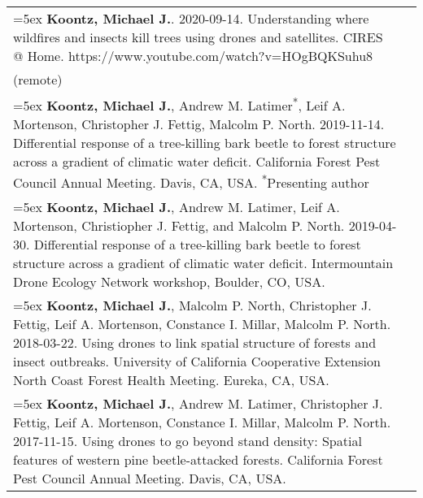 \begin{longtable}{@{}>{\raggedright}p{5.25in} @{} >{\raggedleft}X@{}}
\hangindent=5ex \textbf{Koontz, Michael J.}. 2020-09-14. Understanding where wildfires and insects kill trees using drones and satellites. CIRES @ Home. https://www.youtube.com/watch?v=HOgBQKSuhu8 & 2020 \\ (remote) \tabularnewline

\hangindent=5ex \textbf{Koontz, Michael J.}, Andrew M. Latimer\textsuperscript{*}, Leif A. Mortenson, Christopher J. Fettig, Malcolm P. North. 2019-11-14. Differential response of a tree-killing bark beetle to forest structure across a gradient of climatic water deficit. California Forest Pest Council Annual Meeting. Davis, CA, USA. \newline \textsuperscript{*}Presenting author & 2019 \tabularnewline

\hangindent=5ex \textbf{Koontz, Michael J.}, Andrew M. Latimer, Leif A. Mortenson, Christiopher J. Fettig, and Malcolm P. North. 2019-04-30. Differential response of a tree-killing bark beetle to forest structure across a gradient of climatic water deficit. Intermountain Drone Ecology Network workshop, Boulder, CO, USA. & 2019 \tabularnewline

\hangindent=5ex \textbf{Koontz, Michael J.}, Malcolm P. North, Christopher J. Fettig, Leif A. Mortenson, Constance I. Millar, Malcolm P. North. 2018-03-22. Using drones to link spatial structure of forests and insect outbreaks. University of California Cooperative Extension North Coast Forest Health Meeting. Eureka, CA, USA. & 2018 \tabularnewline

\hangindent=5ex \textbf{Koontz, Michael J.}, Andrew M. Latimer, Christopher J. Fettig, Leif A. Mortenson, Constance I. Millar, Malcolm P. North. 2017-11-15. Using drones to go beyond stand density: Spatial features of western pine beetle-attacked forests. California Forest Pest Council Annual Meeting. Davis, CA, USA. & 2017

\end{longtable}
